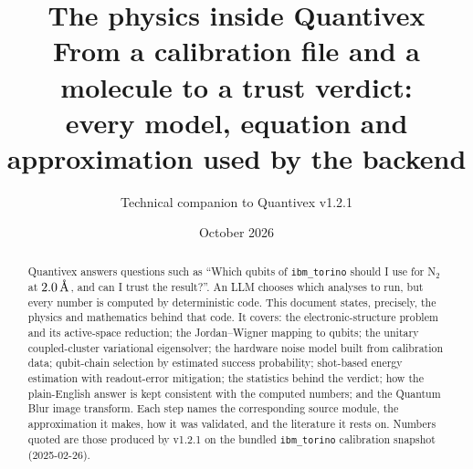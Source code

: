 \documentclass[10pt,a4paper]{article}
\title{\vspace{-8mm}\textbf{The physics inside Quantivex}\\[3pt]
\large From a calibration file and a molecule to a trust verdict:\\ every model, equation and approximation used by the backend}
\author{Technical companion to Quantivex v1.2.1}
\date{October 2026}
\newcommand{\Ang}{\ensuremath{\,\text{\normalfont\AA}}}
\begin{document}
\maketitle
\thispagestyle{fancy}

\begin{abstract}
\noindent Quantivex answers questions such as ``Which qubits of \texttt{ibm\_torino} should I use for N$_2$ at $2.0\Ang$, and can I trust the result?''. An LLM chooses which analyses to run, but every number is computed by deterministic code. This document states, precisely, the physics and mathematics behind that code. It covers: the electronic-structure problem and its active-space reduction; the Jordan--Wigner mapping to qubits; the unitary coupled-cluster variational eigensolver; the hardware noise model built from calibration data; qubit-chain selection by estimated success probability; shot-based energy estimation with readout-error mitigation; the statistics behind the verdict; how the plain-English answer is kept consistent with the computed numbers; and the Quantum Blur image transform. Each step names the corresponding source module, the approximation it makes, how it was validated, and the literature it rests on. Numbers quoted are those produced by v1.2.1 on the bundled \texttt{ibm\_torino} calibration snapshot (2025-02-26).
\end{abstract}

\tableofcontents

\end{document}
